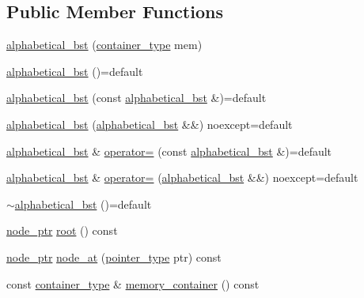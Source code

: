 \subsection*{Public Member Functions}
\begin{DoxyCompactItemize}
\item 
\mbox{\hyperlink{classirk_1_1alphabetical__bst_a21a5c2844dc3bf7bb86e6fa86df2c4c4}{alphabetical\+\_\+bst}} (\mbox{\hyperlink{classirk_1_1alphabetical__bst_aeed9efc6a48ff6d504a608e06223f386}{container\+\_\+type}} mem)
\item 
\mbox{\hyperlink{classirk_1_1alphabetical__bst_aa4c4b01aac537a6cf70dba71002e1f7d}{alphabetical\+\_\+bst}} ()=default
\item 
\mbox{\hyperlink{classirk_1_1alphabetical__bst_a39fbd9f70b56a343b43e529621885f5a}{alphabetical\+\_\+bst}} (const \mbox{\hyperlink{classirk_1_1alphabetical__bst}{alphabetical\+\_\+bst}} \&)=default
\item 
\mbox{\hyperlink{classirk_1_1alphabetical__bst_a783898827b1315ae59daf77d31f10d97}{alphabetical\+\_\+bst}} (\mbox{\hyperlink{classirk_1_1alphabetical__bst}{alphabetical\+\_\+bst}} \&\&) noexcept=default
\item 
\mbox{\hyperlink{classirk_1_1alphabetical__bst}{alphabetical\+\_\+bst}} \& \mbox{\hyperlink{classirk_1_1alphabetical__bst_ab78a09e29fa6027fe10f1909477288c2}{operator=}} (const \mbox{\hyperlink{classirk_1_1alphabetical__bst}{alphabetical\+\_\+bst}} \&)=default
\item 
\mbox{\hyperlink{classirk_1_1alphabetical__bst}{alphabetical\+\_\+bst}} \& \mbox{\hyperlink{classirk_1_1alphabetical__bst_ac10152f7ca8cc4a04ffdae7ff6248b94}{operator=}} (\mbox{\hyperlink{classirk_1_1alphabetical__bst}{alphabetical\+\_\+bst}} \&\&) noexcept=default
\item 
\mbox{\hyperlink{classirk_1_1alphabetical__bst_ae03b179ec6e763b0f74b106bd51fe1d9}{$\sim$alphabetical\+\_\+bst}} ()=default
\item 
\mbox{\hyperlink{structirk_1_1alphabetical__bst_1_1node__ptr}{node\+\_\+ptr}} \mbox{\hyperlink{classirk_1_1alphabetical__bst_a28fa90a8d7eec6045a035c44e93a1a13}{root}} () const
\item 
\mbox{\hyperlink{structirk_1_1alphabetical__bst_1_1node__ptr}{node\+\_\+ptr}} \mbox{\hyperlink{classirk_1_1alphabetical__bst_a6330f671acd304c9ca37c3ac6aff3655}{node\+\_\+at}} (\mbox{\hyperlink{classirk_1_1alphabetical__bst_ae689c05ab96a71769e24908d5c73765c}{pointer\+\_\+type}} ptr) const
\item 
const \mbox{\hyperlink{classirk_1_1alphabetical__bst_aeed9efc6a48ff6d504a608e06223f386}{container\+\_\+type}} \& \mbox{\hyperlink{classirk_1_1alphabetical__bst_a273b1d4ffff62f2f8a034d979062e43c}{memory\+\_\+container}} () const

\end{DoxyCompactItemize}
